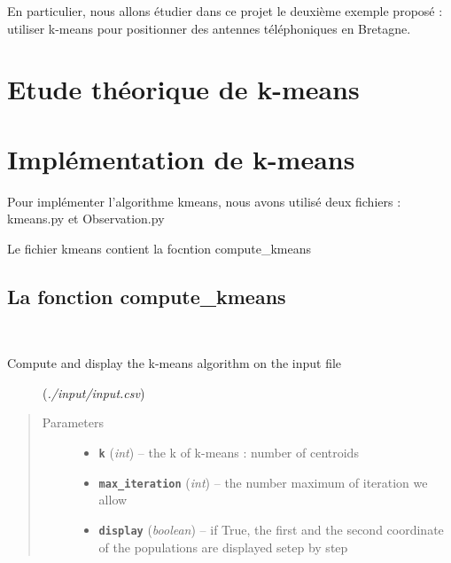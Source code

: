 \documentclass[letterpaper,10pt,english]{sphinxmanual}
\begin{document}
En particulier, nous allons étudier dans ce projet le deuxième exemple proposé : utiliser k-means pour positionner des antennes téléphoniques en Bretagne.


\section{Etude théorique de k-means}
\label{kmeans:imagenet}\label{kmeans:etude-theorique-de-k-means}\label{kmeans::doc}

\section{Implémentation de k-means}
\label{impl:module-kmeans}\label{impl::doc}\label{impl:implementation-de-k-means}
Pour implémenter l'algorithme kmeans, nous avons utilisé deux fichiers :
kmeans.py et Observation.py

Le fichier kmeans contient la focntion compute\_kmeans


\subsection{La fonction compute\_kmeans}
\label{impl:la-fonction-compute-kmeans}

\begin{fulllineitems}
\label{impl:kmeans.compute_kmeans}~\begin{description}
\item[{Compute and display the k-means algorithm on the input file }] \leavevmode
(\emph{./input/input.csv})

\end{description}
\begin{quote}\begin{description}
\item[{Parameters}] \leavevmode\begin{itemize}
\item {} 
\textbf{\texttt{k}} (\emph{int}) -- the k of k-means : number of centroids

\item {} 
\textbf{\texttt{max\_iteration}} (\emph{int}) -- the number maximum of iteration we allow

\item {} 
\textbf{\texttt{display}} (\emph{boolean}) -- if True, the first and the second coordinate of the 
populations are displayed setep by step

\end{itemize}

\end{description}\end{quote}

\end{fulllineitems}
\end{document}
